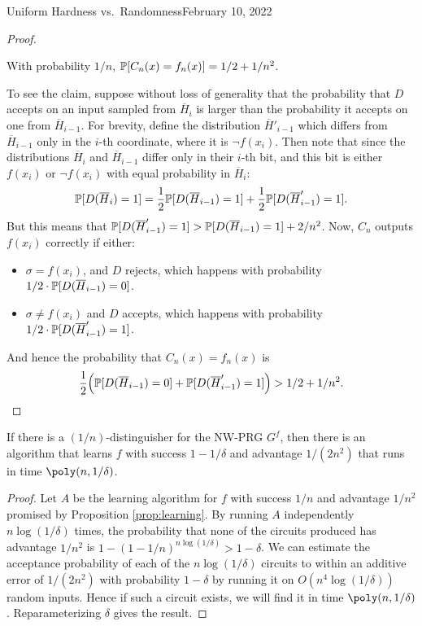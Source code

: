 \begin{lecture}{4}{Uniform Hardness vs.\ Randomness}{February 10, 2022}
\begin{proof}
  \begin{claim}
    With probability $1 / n$, $\mathbb{P}[C_n(x) = f_n(x)] = 1/2 + 1/n^2$.
  \end{claim}
  To see the claim, suppose without loss of generality that the probability
  that $D$ accepts on an input sampled from $\overline{H}_{i}$ is larger
  than the probability it accepts on one from $\overline{H}_{i - 1}$.
  For brevity, define the distribution $\overline{H}'_{i - 1}$ which differs
  from $\overline{H}_{i - 1}$ only in the $i$-th coordinate, where it is
  $\lnot f(x_i)$.
  Then note that since the distributions $\overline{H}_i$ and
  $\overline{H}_{i - 1}$ differ only in their $i$-th bit, and this bit is
  either $f(x_i)$ or $\lnot f(x_i)$ with equal probability in
  $\overline{H}_i$:
  \[
    \mathbb{P}[D(\overline{H}_{i}) = 1]
    = \frac 12 \mathbb{P}[D(\overline{H}_{i - 1}) = 1]
    + \frac 12 \mathbb{P}[D(\overline{H}'_{i - 1}) = 1].
  \]
  But this means that $\mathbb{P}[D(\overline{H}'_{i - 1}) = 1] >
  \mathbb{P}[D(\overline{H}_{i - 1}) = 1] + 2/n^2$.
  Now, $C_n$ outputs $f(x_i)$ correctly if either:
  \begin{itemize}
    \item $\sigma = f(x_i)$, and $D$ rejects, which happens with
      probability $1/2 \cdot \mathbb{P}[D(\overline{H}_{i - 1}) = 0]$.
    \item $\sigma \neq f(x_i)$ and $D$ accepts, which happens with
      probability $1/2 \cdot \mathbb{P}[D(\overline{H}'_{i - 1}) = 1]$.
  \end{itemize}
  And hence the probability that $C_n(x) = f_n(x)$ is
  \[
    \frac 12 \paren*{
      \Pr\brac{D(\overline{H}_{i - 1}) = 0} +
      \Pr\brac{D(\overline{H}'_{i - 1}) = 1}
      }
      > 1/2 + 1/n^2.
    \]
\end{proof}

\begin{corollary}
  \label{corr:learning-boost-success}
  If there is a $(1/n)$-distinguisher for the NW-PRG $G^f$, then there is an
  algorithm that learns $f$ with success $1 - 1/\delta$ and advantage
  $1/(2n^2)$ that runs in time $\poly(n, 1/\delta)$.
\end{corollary}

\begin{proof}
  Let $A$ be the learning algorithm for $f$ with success $1/n$ and advantage
  $1/n^2$ promised by Proposition \ref{prop:learning}. By running $A$
  independently $n \log(1/\delta)$ times, the probability that none of the
  circuits produced has advantage $1/n^2$ is $1 - (1 - 1/n)^{n\log(1/\delta)} >
  1 - \delta$. We can estimate the acceptance probability of each of the
  $n\log(1/\delta)$ circuits to within an additive error of $1/(2n^2)$ with
  probability $1 - \delta$ by running it on $O(n^4 \log(1/\delta))$ random
  inputs. Hence if such a circuit exists, we will find it in time $\poly(n,
  1/\delta)$. Reparameterizing $\delta$ gives the result.
\end{proof}


\end{lecture}
